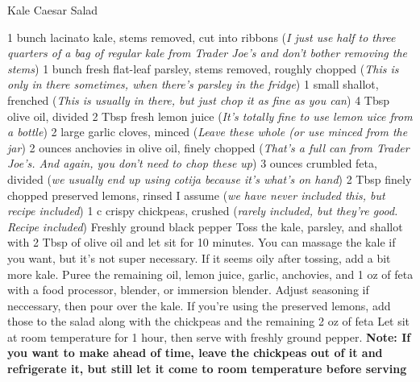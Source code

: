 \documentclass[../cookbook.tex]{subfiles}
\begin{document}
\begin{recipe}{Kale Caesar Salad}

\ingredients
{1 bunch lacinato kale, stems removed, cut into ribbons (\textit{I just use half to three quarters of a bag of regular kale from Trader Joe's and don't bother removing the stems})}
{1 bunch fresh flat-leaf parsley, stems removed, roughly chopped (\textit{This is only in there sometimes, when there's parsley in the fridge})}
{1 small shallot, frenched (\textit{This is usually in there, but just chop it as fine as you can})}
{4 Tbsp olive oil, divided}
{2 Tbsp fresh lemon juice (\textit{It's totally fine to use lemon uice from a bottle})}
{2 large garlic cloves, minced (\textit{Leave these whole (or use minced from the jar})}
{2 ounces anchovies in olive oil, finely chopped (\textit{That's a full can from Trader Joe's. And again, you don't need to chop these up})}
{3 ounces crumbled feta, divided (\textit{we usually end up using cotija because it's what's on hand})}
{2 Tbsp finely chopped preserved lemons, rinsed I assume (\textit{we have never included this, but recipe included})}
{1 c crispy chickpeas, crushed (\textit{rarely included, but they're good. Recipe included})}
{Freshly ground black pepper}
\stopingredients
\preparation
{Toss the kale, parsley, and shallot with 2 Tbsp of olive oil and let sit for 10 minutes. You can massage the kale if you want, but it's not super necessary. If it seems oily after tossing, add a bit more kale.}
{Puree the remaining oil, lemon juice, garlic, anchovies, and 1 oz of feta with a food processor, blender, or immersion blender. Adjust seasoning if neccessary, then pour over the kale.}
{If you're using the preserved lemons, add those to the salad along with the chickpeas and the remaining 2 oz of feta}
{Let sit at room temperature for 1 hour, then serve with freshly ground pepper. \textbf{Note: If you want to make ahead of time, leave the chickpeas out of it and refrigerate it, but still let it come to room temperature before serving}}
\stopprep
\end{recipe}
\end{document}
